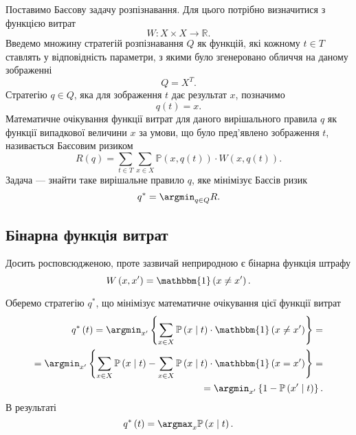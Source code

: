 Поставимо Баєсову задачу розпізнавання.
Для цього потрібно визначитися з функцією витрат
\cite{berger1980}
\begin{equation*}
  W: X \times X \rightarrow \mathbb{R}.
\end{equation*}
Введемо множину стратегій розпізнавання $Q$ як функцій,
які кожному $t \in T$ ставлять у відповідність параметри,
з якими було згенеровано обличчя на даному зображенні
\begin{equation*}
  Q = X^T.
\end{equation*}
Стратегію $q \in Q$, яка для зображення $t$ дає результат $x$, позначимо
\begin{equation*}
  q\left( t \right) = x.
\end{equation*}
Математичне очікування функції витрат для даного вирішального правила $q$
як функції випадкової величини $x$ за умови,
що було пред'явлено зображення $t$, називається Баєсовим ризиком
\cite{schlesinger:2002}
\begin{equation*}
  R \left( q \right)
  = \sum\limits_{t \in T} \sum\limits_{x \in X}
    \mathbb{P} \left( x,  q\left( t \right) \right)
    \cdot W \left( x, q\left( t \right) \right).
\end{equation*}
Задача --- знайти таке вирішальне правило $q$, яке мінімізує Баєсів ризик
\begin{equation*}
  q^* = \argmin_{q \in Q} R.
\end{equation*}

\subsection{Бінарна функція витрат}

Досить росповсюдженою, проте зазвичай неприродною є бінарна функція штрафу
\begin{equation*}
  W \left( x, x' \right)
  = \mathbbm{1} \left( x \neq x' \right).
\end{equation*}

Оберемо стратегію $q^*$,
що мінімізує математичне очікування цієї функції витрат
\begin{equation*}
  \begin{split}
    q^* \left( t \right)
    = \argmin_{x'} \left\{
      \sum\limits_{x \in X}
        \mathbb{P} \left( x \;\middle|\;  t \right)
        \cdot \mathbbm{1} \left( x \neq x' \right)
      \right\} = \\
    = \argmin_{x'} \left\{
      \sum\limits_{x \in X}
        \mathbb{P} \left( x \;\middle|\;  t \right)
      - \sum\limits_{x \in X}
        \mathbb{P} \left( x \;\middle|\;  t \right)
        \cdot \mathbbm{1} \left( x = x' \right)
      \right\} = \\
    = \argmin_{x'} \left\{
      1 - \mathbb{P} \left( x' \;\middle|\;  t \right)
      \right\}.
  \end{split}
\end{equation*}
В результаті
\begin{equation*}
  q^* \left( t \right)
  = \argmax_x \mathbb{P} \left( x \;\middle|\;  t \right).
\end{equation*}

